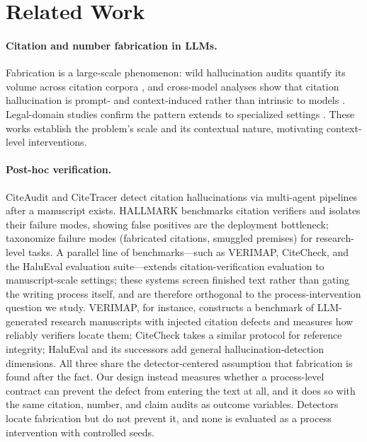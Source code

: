 \documentclass[10pt,twocolumn]{article}
\begin{document}
\section{Related Work}
\label{sec:related}

\paragraph{Citation and number fabrication in LLMs.}
Fabrication is a large-scale phenomenon: wild hallucination audits quantify its volume across citation corpora \citep{zhao2026wildhallucinations}, and cross-model analyses show that citation hallucination is prompt- and context-induced rather than intrinsic to models \citep{naser2026howllmscite}. Legal-domain studies confirm the pattern extends to specialized settings \citep{alrajeh2026legalcitations}. These works establish the problem's scale and its contextual nature, motivating context-level interventions.

\paragraph{Post-hoc verification.}
CiteAudit \citep{shi2026citeaudit} and CiteTracer \citep{li2026citetracer} detect citation hallucinations via multi-agent pipelines after a manuscript exists. HALLMARK \citep{reizinger2026hallmark} benchmarks citation verifiers and isolates their failure modes, showing false positives are the deployment bottleneck; \citet{banerjee2026failuremodes} taxonomize failure modes (fabricated citations, smuggled premises) for research-level tasks. A parallel line of benchmarks---such as VERIMAP, CiteCheck, and the HaluEval evaluation suite---extends citation-verification evaluation to manuscript-scale settings; these systems screen finished text rather than gating the writing process itself, and are therefore orthogonal to the process-intervention question we study. VERIMAP, for instance, constructs a benchmark of LLM-generated research manuscripts with injected citation defects and measures how reliably verifiers locate them; CiteCheck takes a similar protocol for reference integrity; HaluEval and its successors add general hallucination-detection dimensions. All three share the detector-centered assumption that fabrication is found after the fact. Our design instead measures whether a process-level contract can prevent the defect from entering the text at all, and it does so with the same citation, number, and claim audits as outcome variables. Detectors locate fabrication but do not prevent it, and none is evaluated as a process intervention with controlled seeds.
\end{document}
